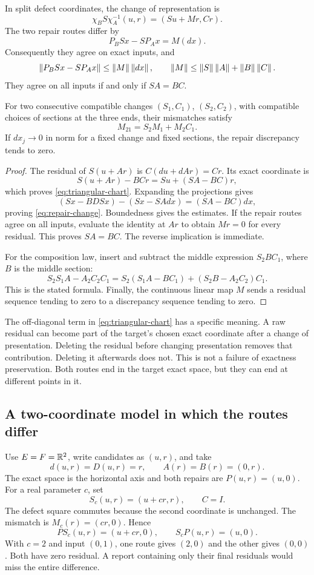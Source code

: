 \begin{theorem}\label{KS66}
In split defect coordinates, the change of representation is
\begin{equation}\label{eq:triangular-chart}
 \chi_BS\chi_A^{-1}(u,r)=(Su+Mr,Cr).
\end{equation}
The two repair routes differ by
\begin{equation}\label{eq:repair-change}
 P_BSx-SP_Ax=M(dx).
\end{equation}
Consequently they agree on exact inputs, and
\[
 \left\lVert P_BSx-SP_Ax\right\rVert\le\left\lVert M\right\rVert\left\lVert dx\right\rVert,
 \qquad \left\lVert M\right\rVert\le\left\lVert S\right\rVert\left\lVert A\right\rVert+\left\lVert B\right\rVert\left\lVert C\right\rVert.
\]
They agree on all inputs if and only if \(SA=BC\).

For two consecutive compatible changes \((S_1,C_1)\), \((S_2,C_2)\), with compatible choices of sections at the three ends, their mismatches satisfy
\[
 M_{21}=S_2M_1+M_2C_1.
\]
If \(dx_j\to0\) in norm for a fixed change and fixed sections, the repair discrepancy tends to zero.
\end{theorem}
\begin{proof}
The residual of \(S(u+Ar)\) is \(C(d u+dAr)=Cr\). Its exact coordinate is
\[
 S(u+Ar)-BCr=Su+(SA-BC)r,
\]
which proves \eqref{eq:triangular-chart}. Expanding the projections gives
\[
 (Sx-BDSx)-(Sx-SAdx)=(SA-BC)dx,
\]
proving \eqref{eq:repair-change}. Boundedness gives the estimates. If the repair routes agree on all inputs, evaluate the identity at \(Ar\) to obtain \(Mr=0\) for every residual. This proves \(SA=BC\). The reverse implication is immediate.

For the composition law, insert and subtract the middle expression \(S_2B C_1\), where \(B\) is the middle section:
\[
 S_2S_1A-A_2C_2C_1
 =S_2(S_1A-BC_1)+(S_2B-A_2C_2)C_1.
\]
This is the stated formula. Finally, the continuous linear map \(M\) sends a residual sequence tending to zero to a discrepancy sequence tending to zero.
\end{proof}
The off-diagonal term in \eqref{eq:triangular-chart} has a specific meaning. A raw residual can become part of the target's chosen exact coordinate after a change of presentation. Deleting the residual before changing presentation removes that contribution. Deleting it afterwards does not. This is not a failure of exactness preservation. Both routes end in the target exact space, but they can end at different points in it.

\subsection{A two-coordinate model in which the routes differ}
Use \(E=F=\mathbb R^2\), write candidates as \((u,r)\), and take
\[
 d(u,r)=D(u,r)=r,\qquad A(r)=B(r)=(0,r).
\]
The exact space is the horizontal axis and both repairs are \(P(u,r)=(u,0)\). For a real parameter \(c\), set
\[
 S_c(u,r)=(u+cr,r),\qquad C=I.
\]
The defect square commutes because the second coordinate is unchanged. The mismatch is \(M_c(r)=(cr,0)\). Hence
\[
 PS_c(u,r)=(u+cr,0),\qquad S_cP(u,r)=(u,0).
\]
With \(c=2\) and input \((0,1)\), one route gives \((2,0)\) and the other gives \((0,0)\). Both have zero residual. A report containing only their final residuals would miss the entire difference.

